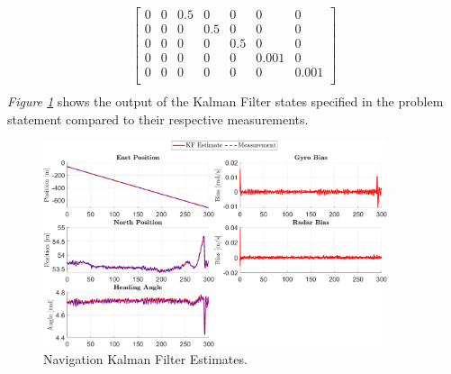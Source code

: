 \documentclass[10pt]{article}
\begin{document}
\begin{enumerate}[label=\textbf{\arabic*.}]
\begin{equation}
\begin{split}
\begin{bmatrix}
        0 & 0 & 0.5 & 0 & 0 & 0 & 0 \\
        0 & 0 & 0 & 0.5 & 0 & 0 & 0 \\
        0 & 0 & 0 & 0 & 0.5 & 0 & 0 \\
        0 & 0 & 0 & 0 & 0 & 0.001 & 0 \\
        0 & 0 & 0 & 0 & 0 & 0 & 0.001 \\
      \end{bmatrix} \\
    \end{split}
    \label{eq:3.3}
  \end{equation}
  \emph{Figure \ref{f:3.1}} shows the output of the Kalman Filter states 
  specified in the problem statement compared to their respective measurements.
  \begin{figure}[H]
    \centering
    \includegraphics[width=0.9\textwidth]{p3_a2.png}
    \caption{Navigation Kalman Filter Estimates.}
    \label{f:3.1}
  \end{figure}


\end{enumerate}
\end{document}
